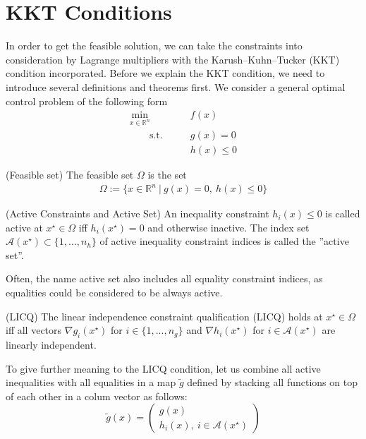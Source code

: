 	\section{KKT Conditions}
	\label{Sec_KKT}
	In order to get the feasible solution, we can take the constraints into consideration by Lagrange multipliers with the Karush–Kuhn–Tucker (KKT) condition incorporated. Before we explain the KKT condition, we need to introduce several definitions and theorems first. We consider a general optimal control problem of the following form
	\begin{equation}
		\label{eq:OCP_discret_compact}
		\begin{aligned}
			\underset{x \in \mathbb{R}^n}{\text{min}} \qquad &f(x)	\\
			\qquad \text{s.t.}\qquad	&  g(x)	 = 0   \\
			&  h(x)	\leq 0 
		\end{aligned}
	\end{equation}
	\begin{definition}(Feasible set) The feasible set $\Omega$ is the set 
		\begin{align}
			\Omega:= \{x \in \mathbb{R}^n \ | \ g(x)= 0 , \ h(x)	\leq 0 \}	
		\end{align}
	\end{definition}	
	\begin{definition}(Active Constraints and Active Set) An inequality constraint $h_i(x) \leq 0$ is called active at $x^\star \in  \Omega$  iff  $h_i(x^\star) = 0$ and otherwise inactive. The index set $\mathcal{A}(x^\star) \subset \{1, ..., n_h\}$  of active inequality constraint indices is called the ”active set”.
	\end{definition}
	Often, the name active set also includes all equality constraint indices, as equalities could be considered to be always active. 
	\begin{definition} (LICQ) The linear independence constraint qualification (LICQ) holds at $x^\star \in  \Omega $ iff all vectors $\nabla g_i(x^\star)$ for $i \in \{1, ..., n_g \}$ and $\nabla h_i(x^\star)$ for  $i \in \mathcal{A}(x^\star)$ are linearly independent.
		\label{df_LICO}
	\end{definition}
	To give further meaning to the LICQ condition, let us combine all active inequalities with all equalities in a map $\tilde{g}$ defined by stacking all functions on top of each other in a colum vector as follows:
	\begin{equation}
		\tilde{g}(x) =  \begin{pmatrix} g(x) \\ h_i(x), \ i \in \mathcal{A}(x^\star)    \end{pmatrix}
	\end{equation}
